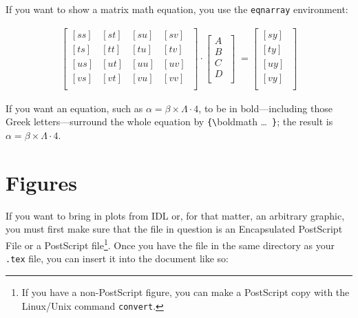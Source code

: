 \documentclass[preprint]{aastex}
\begin{document}
If you want to show a matrix math equation, you use the {\tt eqnarray}
environment:

\begin{eqnarray} \label{smeqn}
\left[
\begin{array}{cccc}
{[ ss ]} & {[ st ]} & {[ su ]} & {[ sv ]} \\
{[ ts ]} & {[ tt ]} & {[ tu ]} & {[ tv ]} \\
{[ us ]} & {[ ut ]} & {[ uu ]} & {[ uv ]} \\
{[ vs ]} & {[ vt ]} & {[ vu ]} & {[ vv ]} \\
\end{array}
\; \right] 
\cdot
\left[
\begin{array}{c}
A \\
B \\
C \\
D \\
\end{array}
\; \right]
\; =
\left[
\begin{array}{c}
{[ s y ]} \\
{[ t y ]} \\
{[ u y ]} \\
{[ v y ]} \\
\end{array}
\; \right]
\end{eqnarray}

If you want an equation, such as $\alpha = \beta \times \Lambda \cdot
4$, to be in bold---including those Greek letters---surround the whole
equation by \verb${\${boldmath} \dots \ \verb$}$; the result is {\boldmath
$\alpha = \beta \times \Lambda \cdot 4$}.


\section{Figures}\label{figsec}

        If you want to bring in plots from IDL or, for that matter, an
arbitrary graphic, you must first make sure that the file in question is
an Encapsulated PostScript File or a PostScript file\footnote{If you
  have a non-PostScript figure, you can make a PostScript copy with the
  Linux/Unix command {\tt convert}.}.  Once you have the
file in the same directory as your \verb&.tex& file, you can insert it
into the document like so:
\end{document}
